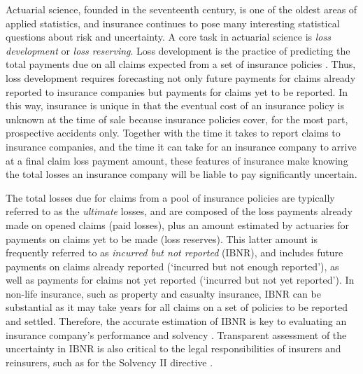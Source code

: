 Actuarial science, founded in the seventeenth century,
is one of the oldest areas
of applied statistics, 
and insurance continues to pose
many interesting statistical questions
about risk and uncertainty.
A core task in actuarial science is
\textit{loss development} or \textit{loss reserving}.
Loss development is the practice of
predicting the total 
payments due on all 
claims expected from
a set of insurance policies \citep{englandverrall2002,zhang2012}.
Thus, loss development requires
forecasting not only future payments for
claims already reported to insurance companies 
but payments for claims yet to be reported.
In this way, insurance is unique in that 
the eventual cost of 
an insurance policy
is unknown at the time of sale
because insurance policies cover, for the most part,
prospective accidents only.
Together with the time it takes to report claims
to insurance companies, and the time it can
take for an insurance company to arrive
at a final claim loss payment amount,
these features of insurance make knowing
the total losses an insurance company will
be liable to pay significantly uncertain. 

The total losses due for claims
from a pool of insurance policies
are typically referred to as
the \textit{ultimate} losses, and are composed
of the loss payments already made on opened
claims (paid losses), plus an amount estimated by actuaries
for payments on claims yet to be made (loss reserves).
This latter amount is frequently referred to as
\textit{incurred but not reported} (IBNR), and
includes future payments on
claims already reported (`incurred but not enough reported'),
as well as payments for claims not yet reported (`incurred but not
yet reported').
In non-life insurance, 
such as property and casualty insurance,
IBNR can be substantial as it may
take years for all claims on a set of policies to be reported and settled.
Therefore, the accurate estimation of IBNR is key to evaluating an insurance company's
performance and solvency \citep{beard1960,bornhuetter1972,friedland2010,englandverrall2002,wuthrich2008}.
Transparent assessment of the uncertainty in IBNR 
is also critical to the legal responsibilities
of insurers and reinsurers, such as for the Solvency II directive
\citep{england2019,frohlich2018,munroe2018}.

